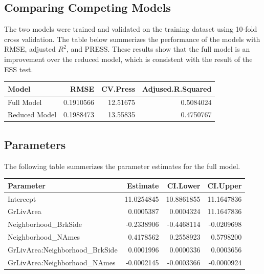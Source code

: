 \documentclass[american,]{article}
\begin{document}
\hypertarget{comparing-competing-models}{%
\subsection{Comparing Competing
Models}\label{comparing-competing-models}}

The two models were trained and validated on the training dataset using
10-fold cross validation. The table below summerizes the performance of
the models with RMSE, adjusted \(R^2\), and PRESS. These results show
that the full model is an improvement over the reduced model, which is
consistent with the result of the ESS test.

\begin{table}[H]
\centering
\begin{tabular}{lrrr}
\toprule
Model & RMSE & CV.Press & Adjused.R.Squared\\
\midrule
Full Model & 0.1910566 & 12.51675 & 0.5084024\\
Reduced Model & 0.1988473 & 13.55835 & 0.4750767\\
\bottomrule
\end{tabular}
\end{table}

\hypertarget{parameters}{%
\subsection{Parameters}\label{parameters}}

The following table summerizes the parameter estimates for the full
model.

\begin{table}[H]
\centering
\begin{tabular}{lrrr}
\toprule
Parameter & Estimate & CI.Lower & CI.Upper\\
\midrule
Intercept & 11.0254845 & 10.8861855 & 11.1647836\\
GrLivArea & 0.0005387 & 0.0004324 & 11.1647836\\
Neighborhood\_BrkSide & -0.2338906 & -0.4468114 & -0.0209698\\
Neighborhood\_NAmes & 0.4178562 & 0.2558923 & 0.5798200\\
GrLivArea:Neighborhood\_BrkSide & 0.0001996 & 0.0000336 & 0.0003656\\
GrLivArea:Neighborhood\_NAmes & -0.0002145 & -0.0003366 & -0.0000924\\
\bottomrule
\end{tabular}
\end{table}
\end{document}

